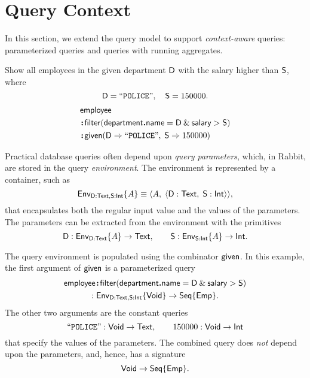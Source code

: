 
\section{Query Context}
\label{sec:context}

In this section, we extend the query model to support \emph{context-aware}
queries: parameterized queries and queries with running aggregates.

\begin{demo}
    \label{ex:parameters}
    Show all employees in the given department $\mathsf{D}$ with the salary
    higher than $\mathsf{S}$, where
    \begin{equation*}
        \mathsf{D}=\mathtt{``POLICE"}, \quad \mathsf{S}=150000.
    \end{equation*}
    \begin{align*}
        & \mathsf{employee} \\
        & \!\boldsymbol{:}\!\mathsf{filter}(\mathsf{department}\boldsymbol{.}\mathsf{name} = \mathsf{D} \mathbin{\&} \mathsf{salary} > \mathsf{S}) \\
        & \!\boldsymbol{:}\!\mathsf{given}(\mathsf{D} \Rightarrow \mathtt{``POLICE"},\; \mathsf{S} \Rightarrow 150000)
    \end{align*}
\end{demo}

Practical database queries often depend upon \emph{query parameters}, which, in
Rabbit, are stored in the query \emph{environment}.  The
environment is represented by a container, such as
\begin{equation*}
    \mathsf{Env}_{\mathsf{D}:\mathsf{Text},\mathsf{S}:\mathsf{Int}}{\left\{A\right\}} \equiv \langle A,\; \langle \mathsf{D}:\mathsf{Text},\; \mathsf{S}:\mathsf{Int} \rangle \rangle,
\end{equation*}
that encapsulates both the regular input value and the values of the
parameters.  The parameters can be extracted from the environment with the
primitives
\begin{equation*}
    \mathsf{D} : \mathsf{Env}_{\mathsf{D}:\mathsf{Text}}{\left\{A\right\}} \to \mathsf{Text}, \qquad
    \mathsf{S} : \mathsf{Env}_{\mathsf{S}:\mathsf{Int}}{\left\{A\right\}} \to \mathsf{Int}.
\end{equation*}

The query environment is populated using the combinator $\mathsf{given}$.  In this
example, the first argument of $\mathsf{given}$ is a parameterized query
\begin{multline*}
    \mathsf{employee}\!\boldsymbol{:}\!\mathsf{filter}(\mathsf{department}\boldsymbol{.}\mathsf{name} = \mathsf{D} \mathbin{\&} \mathsf{salary} > \mathsf{S}) \\
    : \mathsf{Env}_{\mathsf{D}:\mathsf{Text},\mathsf{S}:\mathsf{Int}}{\left\{\mathsf{Void}\right\}} \to \mathsf{Seq}{\left\{\mathsf{Emp}\right\}}.
\end{multline*}
The other two arguments are the constant queries
\begin{equation*}
    \mathtt{``POLICE"} : \mathsf{Void} \to \mathsf{Text}, \qquad
    150000 : \mathsf{Void} \to \mathsf{Int}
\end{equation*}
that specify the values of the parameters.  The combined query does \emph{not}
depend upon the parameters, and, hence, has a signature
\begin{equation*}
    \mathsf{Void} \to \mathsf{Seq}{\left\{\mathsf{Emp}\right\}}.
\end{equation*}

